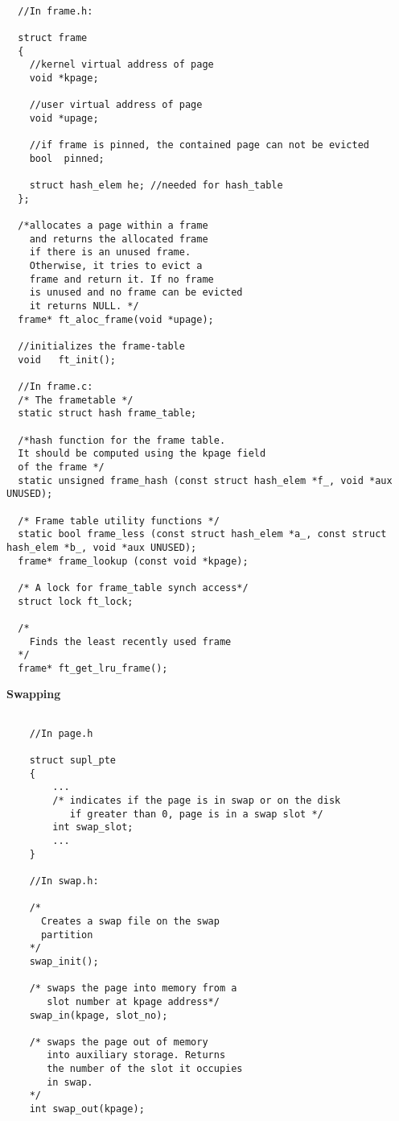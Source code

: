 \begin{lstlisting}

  //In frame.h:

  struct frame
  {
	//kernel virtual address of page
	void *kpage; 	
	  
	//user virtual address of page
	void *upage;	
	
	//if frame is pinned, the contained page can not be evicted
	bool  pinned;		
	
	struct hash_elem he; //needed for hash_table
  };

  /*allocates a page within a frame
    and returns the allocated frame
    if there is an unused frame.
    Otherwise, it tries to evict a 
    frame and return it. If no frame
    is unused and no frame can be evicted
    it returns NULL. */
  frame* ft_aloc_frame(void *upage);
  
  //initializes the frame-table
  void	 ft_init();

  //In frame.c:
  /* The frametable */
  static struct hash frame_table;

  /*hash function for the frame table.
  It should be computed using the kpage field
  of the frame */
  static unsigned frame_hash (const struct hash_elem *f_, void *aux UNUSED);
  
  /* Frame table utility functions */
  static bool frame_less (const struct hash_elem *a_, const struct hash_elem *b_, void *aux UNUSED);
  frame* frame_lookup (const void *kpage);

  /* A lock for frame_table synch access*/
  struct lock ft_lock;

  /*
    Finds the least recently used frame
  */
  frame* ft_get_lru_frame();

\end{lstlisting}

\textbf{Swapping}

\begin{lstlisting}
	
	//In page.h
	
	struct supl_pte
	{
		...
		/* indicates if the page is in swap or on the disk
		   if greater than 0, page is in a swap slot */
		int	swap_slot;
		...
	}
	
	//In swap.h:
	
	/*
	  Creates a swap file on the swap
	  partition
	*/
	swap_init();
	
	/* swaps the page into memory from a
	   slot number at kpage address*/
	swap_in(kpage, slot_no);
	
	/* swaps the page out of memory
	   into auxiliary storage. Returns
	   the number of the slot it occupies
	   in swap.
	*/
	int swap_out(kpage);
	
\end{lstlisting}

